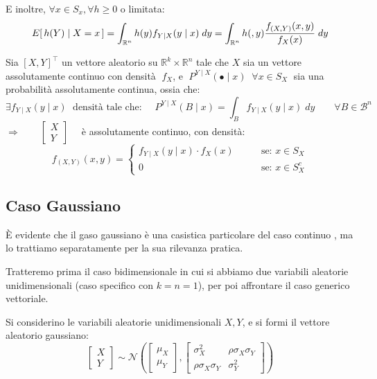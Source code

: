 \noindent E inoltre, $\forall x\in S_x, \forall h\geq 0$ o limitata:
\[E\!\left[\,h(Y)\mid X=x\,\right] = \int_{\mathbb{R}^n} h(y)f_{Y\mid X}(y\mid x)\;dy = \int_{\mathbb{R}^n} h(,y) \frac{f_{(X, Y)}(x, y)}{f_X(x)}\;dy\]

\begin{proposizione}
    Sia $[X, Y]^\top$ un vettore aleatorio su $\mathbb{R}^k\times \mathbb{R}^n$ tale che $X$ sia un vettore assolutamente continuo con densità $\;f_X$, e $\;P^{Y\mid X}(\bullet\mid x)\;\;\forall x\in S_X\;$ sia una probabilità assolutamente continua, ossia che:
    \[\exists f_{Y\mid X}(y\mid x)\;\text{ densità tale che: }\quad P^{Y\mid X}(B\mid x) = \int_B f_{Y\mid X}(y\mid x)\;dy\qquad \forall B\in\mathcal{B}^n\]
    \(\Rightarrow\qquad \begin{bmatrix}X\\Y\end{bmatrix} \quad\) è assolutamente continuo, con densità:
    \[f_{(X, Y)} (x, y) = \begin{cases}
        f_{Y\mid X}(y\mid x)\cdot f_X(x) \qquad &\text{se: }x\in S_X\\
        0 &\text{se: } x\in S_X^c
    \end{cases}\]
\end{proposizione}

\subsection{Caso Gaussiano}
È evidente che il gaso gaussiano è una casistica particolare del caso continuo , ma lo trattiamo separatamente per la sua rilevanza pratica.

\medskip 
\noindent Tratteremo prima il caso bidimensionale in cui si abbiamo due variabili aleatorie unidimensionali (caso specifico con $k=n=1$), per poi affrontare il caso generico vettoriale.

\bigskip
\noindent Si considerino le variabili aleatorie unidimensionali $X, Y$, e si formi il vettore aleatorio gaussiano:
\[\begin{bmatrix}X\\Y\end{bmatrix} \sim \mathcal{N}\left(\begin{bmatrix}\mu_X\\\mu_Y\end{bmatrix}, \begin{bmatrix}\sigma_X^2 & \rho\sigma_X\sigma_Y\\ \rho\sigma_X\sigma_Y& \sigma_Y^2\end{bmatrix}\right)\]

